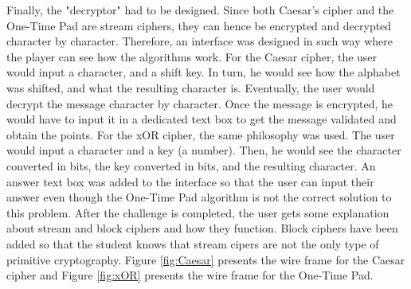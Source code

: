 \documentclass{l4proj}
\begin{document}
Finally, the "decryptor" had to be designed. Since both Caesar's cipher and the One-Time Pad are stream ciphers,
they can hence be encrypted and decrypted character by character. 
Therefore, an interface was designed in such way where the player can see how the algorithms work.
For the Caesar cipher, the user would input a character, and a shift key. 
In turn, he would see how the alphabet was shifted, and what the resulting character is. Eventually,
the user would decrypt the message character by character. 
Once the message is encrypted, he would have to input it in a dedicated text box to get the message validated
and obtain the points. 
For the xOR cipher, the same philosophy was used. The user would input a character and a key (a number).
Then, he would see the character converted in bits, the key converted in bits, and the resulting character.
An answer text box was added to the interface so that the user can input their answer even though
the One-Time Pad algorithm is not the correct solution to this problem.
After the challenge is completed, 
the user gets some explanation about stream and block ciphers and how they function.
Block ciphers have been added so that the student knows that stream cipers are not 
the only type of primitive cryptography.
Figure \ref{fig:Caesar} presents the wire frame for the Caesar cipher 
and Figure \ref{fig:xOR} presents the wire frame for the One-Time Pad.
\end{document}
